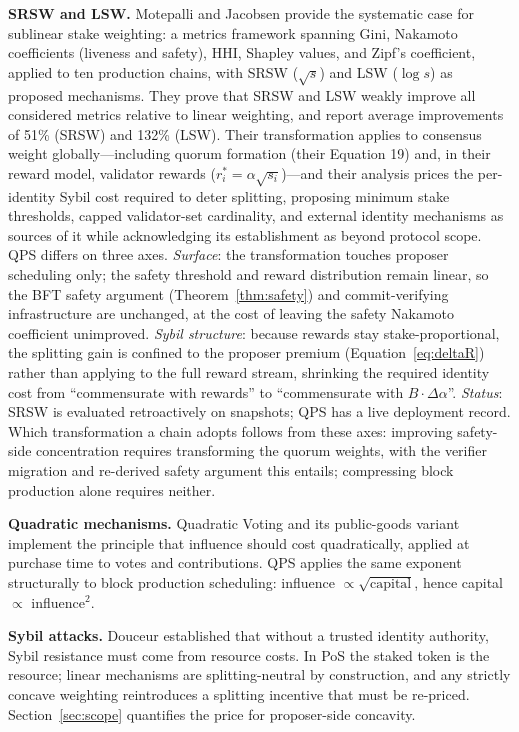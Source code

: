 \documentclass[11pt,a4paper]{article}
\begin{document}
\textbf{SRSW and LSW.} Motepalli and Jacobsen \cite{srsw} provide the systematic case for sublinear stake weighting: a metrics framework spanning Gini, Nakamoto coefficients (liveness and safety), HHI, Shapley values, and Zipf's coefficient, applied to ten production chains, with SRSW ($\sqrt{s}$) and LSW ($\log s$) as proposed mechanisms. They prove that SRSW and LSW weakly improve all considered metrics relative to linear weighting, and report average improvements of 51\% (SRSW) and 132\% (LSW). Their transformation applies to consensus weight globally---including quorum formation (their Equation 19) and, in their reward model, validator rewards ($r^*_i = \alpha\sqrt{s_i}$)---and their analysis prices the per-identity Sybil cost required to deter splitting, proposing minimum stake thresholds, capped validator-set cardinality, and external identity mechanisms as sources of it while acknowledging its establishment as beyond protocol scope. QPS differs on three axes. \emph{Surface}: the transformation touches proposer scheduling only; the safety threshold and reward distribution remain linear, so the BFT safety argument (Theorem~\ref{thm:safety}) and commit-verifying infrastructure are unchanged, at the cost of leaving the safety Nakamoto coefficient unimproved. \emph{Sybil structure}: because rewards stay stake-proportional, the splitting gain is confined to the proposer premium (Equation~\ref{eq:deltaR}) rather than applying to the full reward stream, shrinking the required identity cost from ``commensurate with rewards'' to ``commensurate with $B \cdot \Delta\alpha$''. \emph{Status}: SRSW is evaluated retroactively on snapshots; QPS has a live deployment record. Which transformation a chain adopts follows from these axes: improving safety-side concentration requires transforming the quorum weights, with the verifier migration and re-derived safety argument this entails; compressing block production alone requires neither.

\textbf{Quadratic mechanisms.} Quadratic Voting \cite{qv} and its public-goods variant \cite{bhw} implement the principle that influence should cost quadratically, applied at purchase time to votes and contributions. QPS applies the same exponent structurally to block production scheduling: influence $\propto \sqrt{\text{capital}}$, hence capital $\propto$ influence$^2$.

\textbf{Sybil attacks.} Douceur \cite{douceur} established that without a trusted identity authority, Sybil resistance must come from resource costs. In PoS the staked token is the resource; linear mechanisms are splitting-neutral by construction, and any strictly concave weighting reintroduces a splitting incentive that must be re-priced. Section~\ref{sec:scope} quantifies the price for proposer-side concavity.
\end{document}
